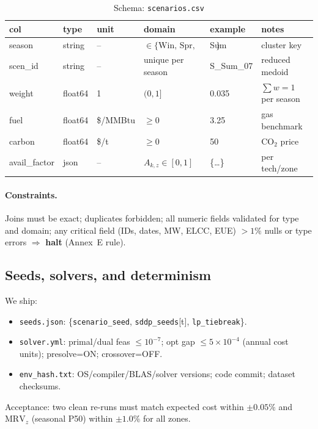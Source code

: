 \documentclass[11pt]{article}
\newcommand{\MRV}{\ensuremath{\mathrm{MRV}}}
\numberwithin{equation}{section}
\theoremstyle{definition}
\theoremstyle{remark}
\begin{document}
\begin{table}[h]
\centering
\caption{Schema: \texttt{scenarios.csv}}
\label{tab:P_scen}
\begin{tabular}{@{}llllll@{}}
\toprule
\textbf{col} & \textbf{type} & \textbf{unit} & \textbf{domain} & \textbf{example} & \textbf{notes}\\
\midrule
season & string & -- & $\in\{\text{Win, Spr, Sum, Fal}\}$ & Sum & cluster key \\
scen\_id & string & -- & unique per season & S\_Sum\_07 & reduced medoid \\
weight & float64 & 1 & $(0,1]$ & 0.035 & $\sum w=1$ per season \\
fuel & float64 & \$/MMBtu & $\ge 0$ & 3.25 & gas benchmark \\
carbon & float64 & \$/t & $\ge 0$ & 50 & CO$_2$ price \\
avail\_factor & json & -- & $A_{k,z}\in[0,1]$ & \{\dots\} & per tech/zone \\
\bottomrule
\end{tabular}
\end{table}

\paragraph{Constraints.}
Joins must be exact; duplicates forbidden; all numeric fields validated for type and domain; any critical field (IDs, dates, MW, ELCC, EUE) $>\!1\%$ nulls or type errors $\Rightarrow$ \textbf{halt} (Annex~E rule).

\subsection{Seeds, solvers, and determinism}
We ship:
\begin{itemize}[leftmargin=1.2em]
\item \texttt{seeds.json}: \{\texttt{scenario\_seed}, \texttt{sddp\_seeds}[t], \texttt{lp\_tiebreak}\}.
\item \texttt{solver.yml}: primal/dual feas $\le 10^{-7}$; opt gap $\le 5\times10^{-4}$ (annual cost units);
      presolve=ON; crossover=OFF.
\item \texttt{env\_hash.txt}: OS/compiler/BLAS/solver versions; code commit; dataset checksums.
\end{itemize}
Acceptance: two clean re-runs must match expected cost within $\pm 0.05\%$ and
$\MRV_{z}$ (seasonal P50) within $\pm 1.0\%$ for all zones.
\end{document}

